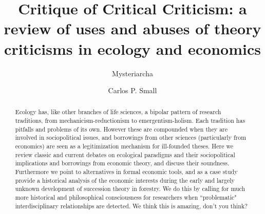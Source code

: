 \documentclass[a4paper, 9pt]{article}
\title{Critique of Critical Criticism: a review of uses and abuses of theory criticisms in ecology and economics}
\author[1]{Mysteriarcha}
\author[1]{Carlos P. Small}
\affil[1]{Vienna Circle Club}
\begin{document}
		
	\maketitle
	
	\begin{abstract}
		Ecology has, like other branches of life sciences, a bipolar pattern of research traditions, from mechanicism-reductionism to emergentism-holism. Each tradition has pitfalls and problems of its own. However these are compounded when they are involved in sociopolitical issues, and borrowings from other sciences (particularly from economics) are seen as a legitimization mechanism for ill-founded theses. Here we review classic and current debates on ecological paradigms and their sociopolitical implications and borrowings from economic theory, and discuss their soundness. Furthermore we point to alternatives in formal economic tools, and as a case study provide a historical analysis of the economic interests during the early and largely unknown development of succession theory in forestry. We do this by calling for much more historical and philosophical consciousness for researchers when ``problematic" interdisciplinary relationships are detected. 
		We think this is amazing, don't you think?
	\end{abstract}
	
	
	
\end{document}
